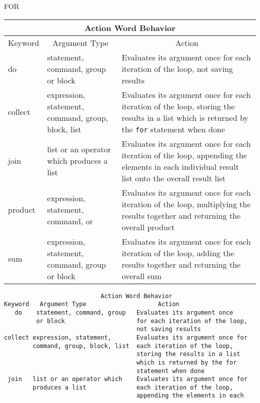 \begin{Command}[for]{FOR}
\begin{Comments}
\begin{TEX}
\begin{center}
\begin{tabular}{|l|p{5cm}|p{5cm}|}
\hline
\multicolumn{3}{|c|}{Action Word Behavior}\\
\hline
\multicolumn{1}{|c|}{Keyword} &
   \multicolumn{1}{c|}{Argument Type} & \multicolumn{1}{c|}{Action} \\
\hline
do & statement, command, group or block &
Evaluates its argument once for each iteration of the loop, not saving
results \\
collect & expression, statement, command, group, block, list &
Evaluates its argument once for each iteration of the loop, storing the results
in a list which is returned by the \verb|for| statement when done \\
join & list or an operator which produces a list &
Evaluates its argument once for each iteration of the loop, appending the
elements in each individual result list onto the overall result list \\
product & expression, statement, command, 
\nameref{group} or \nameref{block} &
Evaluates its argument once for each iteration of the loop, multiplying the
results together and returning the overall product \\
sum & expression, statement, command, group or block &
Evaluates its argument once for each iteration of the loop, adding the results
together and returning the overall sum\\
\hline
\end{tabular}
\end{center}
\end{TEX}
\begin{INFO}
{\begin{verbatim}
                           Action Word Behavior
Keyword   Argument Type                    Action
   do    statement, command, group   Evaluates its argument once
         or block                    for each iteration of the loop,
                                     not saving results
collect expression, statement,       Evaluates its argument once for
        command, group, block, list  each iteration of the loop,
                                     storing the results in a list
                                     which is returned by the for
                                     statement when done
 join   list or an operator which    Evaluates its argument once for
        produces a list              each iteration of the loop,
                                     appending the elements in each

\end{verbatim}}
\end{INFO}
\end{Comments}
\end{Command}
